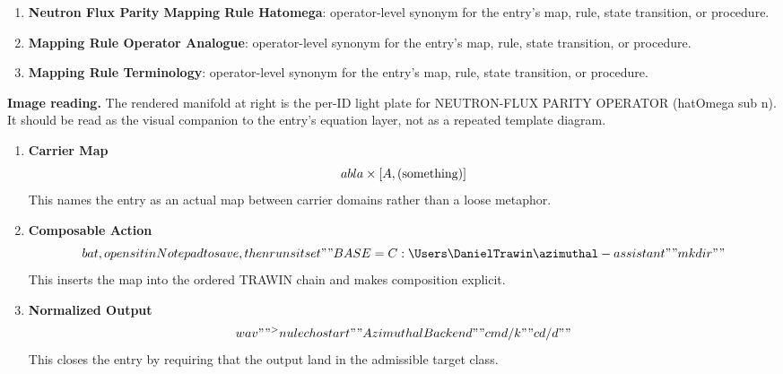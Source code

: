 \begin{enumerate}[leftmargin=1.6em,itemsep=6pt,topsep=4pt]
\item \textbf{Neutron Flux Parity Mapping Rule Hatomega}: operator-level synonym for the entry's map, rule, state transition, or procedure.
\item \textbf{Mapping Rule Operator Analogue}: operator-level synonym for the entry's map, rule, state transition, or procedure.
\item \textbf{Mapping Rule Terminology}: operator-level synonym for the entry's map, rule, state transition, or procedure.
\end{enumerate}

\begin{samepage}
\noindent\begin{minipage}[t]{0.45\linewidth}
\vspace{0pt}
\raggedright
\scriptsize\textbf{Image reading.} The rendered manifold at right is the per-ID light plate for NEUTRON-FLUX PARITY OPERATOR (hatOmega sub n). It should be read as the visual companion to the entry's equation layer, not as a repeated template diagram.\par
\end{minipage}\hfill
\begin{minipage}[t]{0.53\linewidth}
\vspace*{-0.10in}
\raggedright
{}
\end{minipage}
\end{samepage}

\clearpage


\begin{enumerate}[leftmargin=1.6em,itemsep=9pt,topsep=6pt]
\item \textbf{Carrier Map}
\[
abla\times[ A\\,(\text{something}) ]
\]
This names the entry as an actual map between carrier domains rather than a loose metaphor.

\item \textbf{Composable Action}
\[
bat, opens it in Notepad to save, then runs it set ""BASE=C:\Users\DanielTrawin\azimuthal-assistant"" mkdir ""%
\]
This inserts the map into the ordered TRAWIN chain and makes composition explicit.

\item \textbf{Normalized Output}
\[
wav"" ^>nul echo start ""Azimuthal Backend"" cmd /k ""cd /d ""%
\]
This closes the entry by requiring that the output land in the admissible target class.
\end{enumerate}

